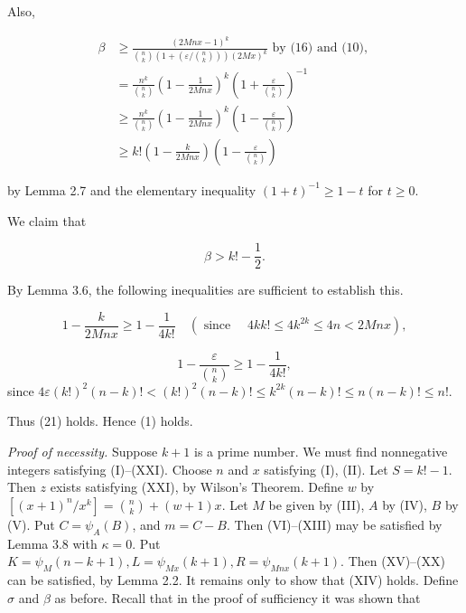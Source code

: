 \documentclass[10pt,letterpaper]{article}
\newcommand{\origpage}[1]{\marginnote{\footnotesize\textbf{[#1]}}}
\begin{document}
Also,

\[
\begin{aligned}
\beta & \geq \frac{(2 M n x-1)^{k}}{\binom{n}{k}\left(1+\left(\varepsilon /\binom{n}{k}\right)\right)(2 M x)^{k}} \text { by (16) and (10), } \\
&=\frac{n^k}{\binom nk}\left(1-\frac{1}{2Mnx}\right)^k
\left(1+\frac{\varepsilon}{\binom nk}\right)^{-1}\\
&\geq\frac{n^k}{\binom nk}\left(1-\frac{1}{2Mnx}\right)^k
\left(1-\frac{\varepsilon}{\binom nk}\right)\\
& \geq k!\left(1-\frac{k}{2 M n x}\right)\left(1-\frac{\varepsilon}{\binom{n}{k}}\right)
\end{aligned}
\]

by Lemma 2.7 and the elementary inequality $(1+t)^{-1}\geq1-t$ for $t\geq0$.

We claim that


\begin{equation*}
\beta>k!-\frac{1}{2} . \tag{21}
\end{equation*}


By Lemma 3.6, the following inequalities are sufficient to establish this.


\begin{equation*}
1-\frac{k}{2 M n x} \geq 1-\frac{1}{4 k!} \quad\left(\text { since } \quad 4 k k!\leq 4 k^{2 k} \leq 4 n<2 M n x\right), \tag{i}
\end{equation*}


\begin{equation*}
1-\frac{\varepsilon}{\binom nk}\geq1-\frac{1}{4k!},\tag{ii}
\end{equation*}
since $4\varepsilon(k!)^2(n-k)!<(k!)^2(n-k)!\leq k^{2k}(n-k)!\leq n(n-k)!\leq n!$.

\origpage{461}Thus (21) holds. Hence (1) holds.

\textit{Proof of necessity.} Suppose $k+1$ is a prime number. We must find nonnegative integers satisfying (I)--(XXI). Choose $n$ and $x$ satisfying (I), (II). Let $S=k!-1$. Then $z$ exists satisfying (XXI), by Wilson's Theorem. Define $w$ by $\left[(x+1)^{n} / x^{k}\right]=\binom{n}{k}+(w+1) x$. Let $M$ be given by (III), $A$ by (IV), $B$ by (V). Put $C=\psi_{A}(B)$, and $m=C-B$. Then (VI)--(XIII) may be satisfied by Lemma 3.8 with $\kappa=0$. Put $K=\psi_{M}(n-k+1), L=\psi_{M x}(k+1), R=\psi_{M n x}(k+1)$. Then (XV)--(XX) can be satisfied, by Lemma 2.2. It remains only to show that (XIV) holds. Define $\sigma$ and $\beta$ as before. Recall that in the proof of sufficiency it was shown that
\end{document}
